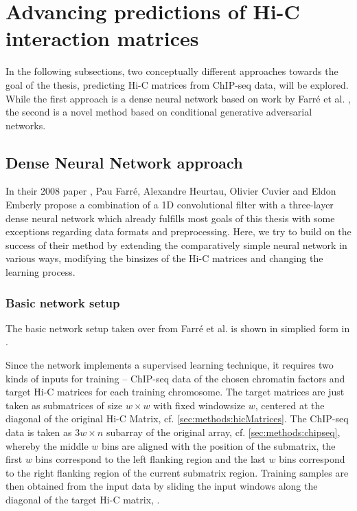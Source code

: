 \section{Advancing predictions of Hi-C interaction matrices}
In the following subsections, two conceptually different approaches towards the goal of the thesis,
predicting Hi-C matrices from ChIP-seq data, will be explored.
While the first approach is a dense neural network based on work by Farr\'e et al. \cite{Farre2018a},
the second is a novel method based on conditional generative adversarial networks.

\subsection{Dense Neural Network approach}\label{sec:DNNapproach}
In their 2008 paper \cite{Farre2018a}, Pau Farr\'e, Alexandre Heurtau, Olivier Cuvier and Eldon Emberly
propose a combination of a 1D convolutional filter with a three-layer dense neural network 
which already fulfills most goals of this thesis with some exceptions regarding data formats and preprocessing.
Here, we try to build on the success of their method by extending the comparatively simple neural network
in various ways, modifying the binsizes of the Hi-C matrices and changing the learning process.

\subsubsection{Basic network setup} \label{sec:improve:basicNetwork}
The basic network setup taken over from Farr\'e et al. \cite{Farre2018a} is shown in simplied form in \xxx.

Since the network implements a supervised learning technique,
it requires two kinds of inputs for training -- ChIP-seq data of the chosen chromatin factors and
target Hi-C matrices for each training chromosome.
The target matrices are just taken as submatrices of size $w \times w$ 
with fixed windowsize $w$, centered at the diagonal of the 
original Hi-C Matrix, cf. \cref{sec:methods:hicMatrices}.
The ChIP-seq data is taken as $3w \times n$ subarray of the original array, cf. \cref{sec:methods:chipseq},
whereby the middle $w$ bins are aligned with the position of the submatrix,
the first $w$ bins correspond to the left flanking region and the last $w$ bins correspond to 
the right flanking region of the current submatrix region. 
Training samples are then obtained from the input data by sliding 
the input windows along the diagonal of the target Hi-C matrix, \xxx.

